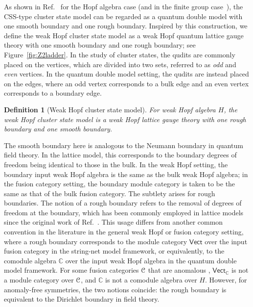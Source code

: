 \documentclass[a4paper,11pt]{article}
\theoremstyle{theorem}
\newtheorem{definition}{Definition}
\theoremstyle{remark}
\newcommand\eC           {\EuScript{C}}
\newcommand{\Cbb}{\mathbb{C}}
\newcommand{\Vect}{\mathsf{Vect}}
\begin{document}
As shown in Ref.~\cite{jia2024generalized} for the Hopf algebra case (and in the finite group case~\cite{fechisin2023noninvertible}), 
the CSS-type cluster state model can be regarded as a quantum double model with one smooth boundary and one rough boundary. 
Inspired by this construction, we define the weak Hopf cluster state model as a weak Hopf quantum lattice gauge theory 
with one smooth boundary and one rough boundary; see Figure~\ref{fig:Z2ladder}. 
In the study of cluster states, the qudits are commonly placed on the vertices, which are divided into two sets, referred to as \emph{odd} and \emph{even} vertices. 
In the quantum double model setting, the qudits are instead placed on the edges, 
where an odd vertex corresponds to a bulk edge and an even vertex corresponds to a boundary edge.


\begin{definition}[Weak Hopf cluster state model] For weak Hopf algebra $H$,  the weak Hopf cluster state model is a weak Hopf lattice gauge theory with one rough boundary and one smooth boundary.
\end{definition}




The smooth boundary here is analogous to the Neumann boundary in quantum field theory. 
In the lattice model, this corresponds to the boundary degrees of freedom being identical to those in the bulk. 
In the weak Hopf setting, the boundary input weak Hopf algebra is the same as the bulk weak Hopf algebra; 
in the fusion category setting, the boundary module category is taken to be the same as that of the bulk fusion category.
The subtlety arises for rough boundaries. The notion of a rough boundary refers to the removal of degrees of freedom at the boundary, 
which has been commonly employed in lattice models since the original work of Ref.~\cite{bravyi1998quantum}. 
This usage differs from another common convention in the literature in the general weak Hopf or fusion category setting, where a rough boundary corresponds to the module category $\Vect$ 
over the input fusion category in the string-net model framework, or equivalently, to the comodule algebra $\mathbb{C}$ 
over the input weak Hopf algebra in the quantum double model framework.
For some fusion categories $\eC$ that are anomalous \cite{thorngren2019fusion}, $\Vect_{\Cbb}$ is not a module category over $\eC$, 
and $\mathbb{C}$ is not a comodule algebra over $H$. 
However, for anomaly-free symmetries, the two notions coincide: 
the rough boundary is equivalent to the Dirichlet boundary in field theory.
\end{document}
